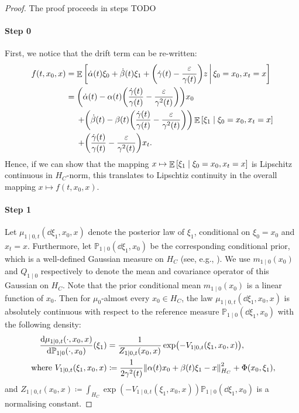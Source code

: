 \begin{proof}
  The proof proceeds in steps TODO
  \paragraph{Step 0}
  First, we notice that the drift term can be re-written:
  \begin{align}
    f(t, x_{0}, x) &= \mathop{\mathbb{E}}\qty[\dot{\alpha}(t) \xi_{0} + \dot{\beta}(t) \xi_{1} + \qty(\dot{\gamma}(t) - \frac{\varepsilon}{\gamma(t)}) z \,\bigg|\, \xi_{0} = x_{0}, x_{t} = x] \notag\\
    &= \qty(\dot{\alpha}(t) - \alpha(t)\qty(\frac{\dot{\gamma}(t)}{\gamma(t)} - \frac{\varepsilon}{\gamma^{2}(t)})) x_{0} \notag\\
    &\mathrel{\phantom{=}}\, + \qty(\dot{\beta}(t) - \beta(t)\qty(\frac{\dot{\gamma}(t)}{\gamma(t)} - \frac{\varepsilon}{\gamma^{2}(t)})) \mathop{\mathbb{E}}\qty[\xi_{1} \mid \xi_{0} = x_{0}, x_{t} = x]\notag \\
    &\mathrel{\phantom{=}}\, + \qty(\frac{\dot{\gamma}(t)}{\gamma(t)} - \frac{\varepsilon}{\gamma^{2}(t)}) x_{t}.\label{eqn:driftreexpressed}
  \end{align}
  Hence, if we can show that the mapping \(x \mapsto \mathop{\mathbb{E}}\qty[\xi_{1} \mid\xi_{0} = x_{0}, x_{t} = x]\) is Lipschitz continuous in \(H_{C}\)-norm, this translates to Lipschtiz continuity in the overall mapping \(x \mapsto f(t, x_{0}, x)\).

  \paragraph{Step 1}
  Let \(\mu_{1 \mid 0, t}(\dd{\xi_{1}}, x_{0}, x)\) denote the posterior law of \(\xi_{1}\), conditional on \(\xi_{0} = x_{0}\) and \(x_{t} = x\). Furthermore, let \(\mathbb{P}_{1 \mid 0}(\dd{\xi_{1}}, x_{0})\) be the corresponding conditional prior, which is a well-defined Gaussian measure on \(H_{C}\)  (see, e.g., \citealp[][Chapter 3.10]{bogachev1998gaussian}). We use \(m_{1 \mid 0}(x_{0})\) and \(Q_{1 \mid 0}\) respectively to denote the mean and covariance operator of this Gaussian on \(H_{C}\). Note that the prior conditional mean \(m_{1 \mid 0}(x_{0})\) is a linear function of \(x_{0}\). Then for \(\mu_{0}\)-almost every \(x_{0} \in H_{C}\), the law \(\mu_{1 \mid 0, t}(\dd{\xi_{1}, x_{0}, x})\) is absolutely continuous with respect to the reference measure \(\mathbb{P}_{1 \mid 0}(\dd{\xi_{1}}, x_{0})\) with the following density:
  \begin{align*}
    \dv{\mu_{1 \mid 0, t}(\cdot, x_{0}, x)}{\mathbb{P}_{1 \mid 0}(\cdot, x_{0})}{}(\xi_{1}) &= \frac{1}{Z_{1 \mid 0,t}(x_{0}, x)}\exp(- V_{1 \mid 0, t}(\xi_{1}, x_{0}, x)),\\
    \text{ where } V_{1 \mid 0, t}(\xi_{1}, x_{0}, x) &\coloneqq \frac{1}{2\gamma^{2}(t)} \norm{\alpha(t) x_{0}+ \beta(t) \xi_{1} - x}_{H_{C}}^{2} + \Phi(x_{0}, \xi_{1}),
  \end{align*}
  and \(Z_{1 \mid 0,t}(x_{0}, x) \coloneqq \int_{H_{C}} \exp(- V_{1 \mid 0, t}(\xi_{1}, x_{0}, x)) \mathbb{P}_{1 \mid 0} (\dd{\xi_{1}, x_{0}})\) is a normalising constant.

\end{proof}
